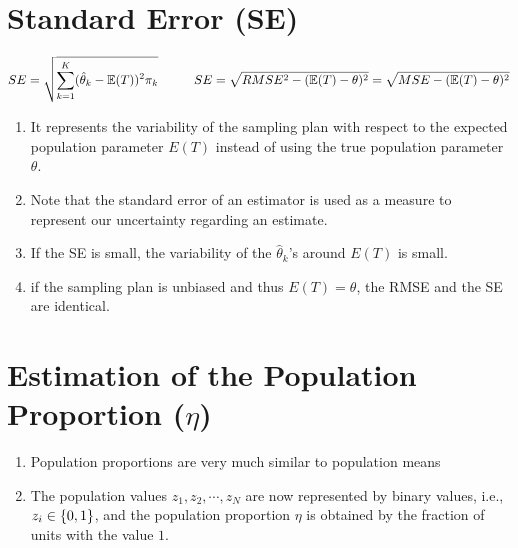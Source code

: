 \section{Standard Error (SE)}

\[
    \hfill
    SE = \sqrt{
        \dsum_{k=1}^{K}
        (\hat{\theta}_k - \mathbb{E}(T))^2\pi_k
    }
    \hspace{1cm}
    SE = \sqrt{RMSE^2 - (\mathbb{E}(T) - \theta)^2}
    = \sqrt{MSE - (\mathbb{E}(T) - \theta)^2}
    \hfill
\]

\begin{enumerate}
    \item It represents the variability of the sampling plan with respect to the expected population parameter $E(T)$ instead of using the true population parameter $\theta$.

    \item Note that the standard error of an estimator is used as a measure to represent our uncertainty regarding an estimate.

    \item If the SE is small, the variability of the $\hat{\theta}_k$’s around $E(T)$ is small.

    \item if the sampling plan is unbiased and thus $E(T) = \theta$, the RMSE and the SE are identical.

\end{enumerate}

\section{Estimation of the Population Proportion ($\eta$) \cite{ism-1}}\label{Estimation of the Population Proportion}

\begin{enumerate}
    \item Population proportions are very much similar to population means

    \item The population values $z_1, z_2,\cdots,z_N$ are now represented by binary values, i.e., $z_i \in \left\{0, 1\right\}$, and the population proportion $\eta$ is obtained by the fraction of units with the value $1$.
\end{enumerate}

